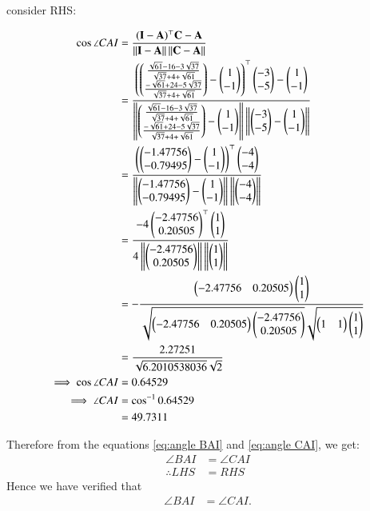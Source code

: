 \documentclass[journal,12pt,twocolumn]{IEEEtran}
\theoremstyle{remark}
\begin{document}
consider RHS:

\begin{align}
\cos{\angle CAI} &= \frac{(\mathbf{I} - \mathbf{A})^{\top}\mathbf{C} - \mathbf{A}}{\left\lVert\mathbf{I} - \mathbf{A}\right\rVert \left\lVert \mathbf{C} - \mathbf{A}\right\rVert}\\
&= \frac{\left(\begin{pmatrix}\frac{{\sqrt{61}-16-3\sqrt{37}}}{\sqrt{37}+4+\sqrt{61}}\\\frac{{-\sqrt{61}+24-5\sqrt{37}}}{\sqrt{37}+4+\sqrt{61}}\end{pmatrix} - \begin{pmatrix}1\\-1\end{pmatrix}\right)^{\top}\begin{pmatrix}-3\\-5\end{pmatrix} - \begin{pmatrix}1\\-1\end{pmatrix}}{\left\lVert\begin{pmatrix}\frac{{\sqrt{61}-16-3\sqrt{37}}}{\sqrt{37}+4+\sqrt{61}}\\ \frac{{-\sqrt{61}+24-5\sqrt{37}}}{\sqrt{37}+4+\sqrt{61}}\end{pmatrix} - \begin{pmatrix}1\\-1\end{pmatrix}\right\rVert \left\lVert\begin{pmatrix}-3\\-5\end{pmatrix} - \begin{pmatrix}1\\-1\end{pmatrix}\right\rVert}\\
&= \frac{\left(\begin{pmatrix}-1.47756\\-0.79495\end{pmatrix} - \begin{pmatrix}1\\-1\end{pmatrix}\right)^{\top}\begin{pmatrix}-4\\-4\end{pmatrix}}{\left\lVert\begin{pmatrix}-1.47756\\-0.79495\end{pmatrix} - \begin{pmatrix}1\\-1\end{pmatrix}\right\rVert \left\lVert \begin{pmatrix}-4\\-4\end{pmatrix}\right\rVert}\\
&= \frac{-4\begin{pmatrix}-2.47756\\0.20505\end{pmatrix}^{\top}\begin{pmatrix}1\\1\end{pmatrix}}{4\left\lVert\begin{pmatrix}-2.47756\\0.20505\end{pmatrix}\right\rVert \left\lVert \begin{pmatrix}1\\1\end{pmatrix}\right\rVert}\\
&= -\frac{\begin{pmatrix}-2.47756&0.20505\end{pmatrix}\begin{pmatrix}1\\1\end{pmatrix}}{\sqrt{\begin{pmatrix}-2.47756&0.20505\end{pmatrix}\begin{pmatrix}-2.47756\\0.20505\end{pmatrix}}\sqrt{\begin{pmatrix}1&1\end{pmatrix}\begin{pmatrix}1\\1\end{pmatrix}}}\\
&= \frac{2.27251}{\sqrt{6.2010538036}\sqrt{2}}\\
\implies \cos{\angle CAI} &= 0.64529 \\
\implies \angle CAI &= \cos^{-1}{0.64529}\\
&= 49.7311 \label{eq:angle CAI}
\end{align}

Therefore from the equations \eqref{eq:angle BAI} and \eqref{eq:angle CAI}, we get:
\begin{align}
\angle BAI &= \angle CAI\\
\therefore LHS &= RHS
\end{align}
Hence we have verified that \begin{align}\angle BAI &= \angle CAI.\end{align}
\end{document}
